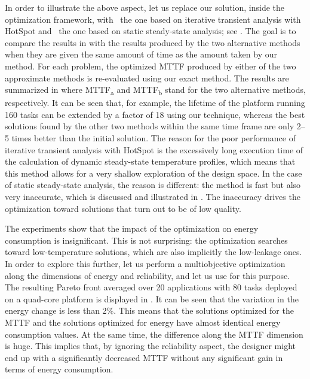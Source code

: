 In order to illustrate the above aspect, let us replace our solution, inside the
optimization framework, with \one~the one based on iterative transient analysis
with HotSpot and \two~the one based on static steady-state analysis; see
. The goal is to compare the results in
 with the results produced by the two alternative
methods when they are given the same amount of time as the amount taken by our
method. For each problem, the optimized \ac{MTTF} produced by either of the two
approximate methods is re-evaluated using our exact method. The results are
summarized in  where
\ac{MTTF}\textsubscript{a} and \ac{MTTF}\textsubscript{b} stand for the two
alternative methods, respectively. It can be seen that, for example, the
lifetime of the platform running 160 tasks can be extended by a factor of 18
using our technique, whereas the best solutions found by the other two methods
within the same time frame are only 2--5 times better than the initial solution.
The reason for the poor performance of iterative transient analysis with HotSpot
is the excessively long execution time of the calculation of dynamic
steady-state temperature profiles, which means that this method allows for a
very shallow exploration of the design space. In the case of static steady-state
analysis, the reason is different: the method is fast but also very inaccurate,
which is discussed and illustrated in . The inaccuracy
drives the optimization toward solutions that turn out to be of low quality.

The experiments show that the impact of the optimization on energy consumption
is insignificant. This is not surprising: the optimization searches toward
low-temperature solutions, which are also implicitly the low-leakage ones. In
order to explore this further, let us perform a multiobjective optimization
along the dimensions of energy and reliability, and let us use 
\cite{deb2002} for this purpose. The resulting Pareto front averaged over 20
applications with 80 tasks deployed on a quad-core platform is displayed in
. It can be seen that the variation in
the energy change is less than 2\%. This means that the solutions optimized for
the \ac{MTTF} and the solutions optimized for energy have almost identical
energy consumption values. At the same time, the difference along the \ac{MTTF}
dimension is huge. This implies that, by ignoring the reliability aspect, the
designer might end up with a significantly decreased \ac{MTTF} without any
significant gain in terms of energy consumption.

